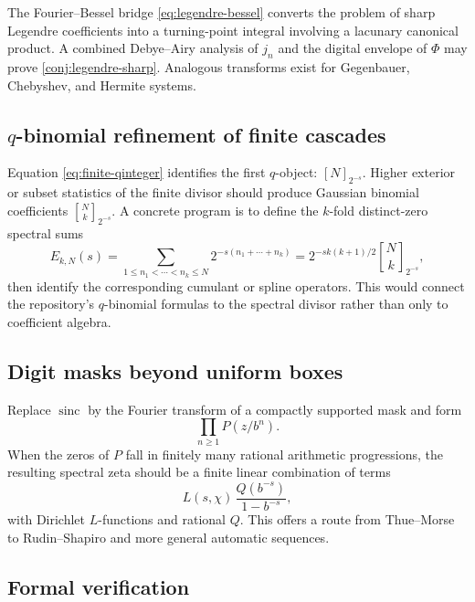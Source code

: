 \documentclass[11pt,oneside]{article}
\theoremstyle{definition}
\theoremstyle{remark}
\newcommand{\sinc}{\operatorname{sinc}}
\begin{document}
The Fourier--Bessel bridge \eqref{eq:legendre-bessel} converts the problem of
sharp Legendre coefficients into a turning-point integral involving a
lacunary canonical product.  A combined Debye--Airy analysis of \(j_n\) and
the digital envelope of \(\Phi\) may prove \cref{conj:legendre-sharp}.
Analogous transforms exist for Gegenbauer, Chebyshev, and Hermite systems.

\subsection{\(q\)-binomial refinement of finite cascades}

Equation \eqref{eq:finite-qinteger} identifies the first \(q\)-object:
\([N]_{2^{-s}}\).  Higher exterior or subset statistics of the finite divisor
should produce Gaussian binomial coefficients
\(\genfrac{[}{]}{0pt}{}{N}{k}_{2^{-s}}\).  A concrete program is to define
the \(k\)-fold distinct-zero spectral sums
\[
 E_{k,N}(s)
 =\sum_{1\leq n_1<\cdots<n_k\leq N}
 2^{-s(n_1+\cdots+n_k)}
 =2^{-sk(k+1)/2}
  \genfrac{[}{]}{0pt}{}{N}{k}_{2^{-s}},
\]
then identify the corresponding cumulant or spline operators.  This would
connect the repository's \(q\)-binomial formulas to the spectral divisor
rather than only to coefficient algebra.

\subsection{Digit masks beyond uniform boxes}

Replace \(\sinc\) by the Fourier transform of a compactly supported mask and
form
\[
 \prod_{n\geq1}P(z/b^n).
\]
When the zeros of \(P\) fall in finitely many rational arithmetic
progressions, the resulting spectral zeta should be a finite linear
combination of terms
\[
 L(s,\chi)\,\frac{Q(b^{-s})}{1-b^{-s}},
\]
with Dirichlet \(L\)-functions and rational \(Q\).  This offers a route from
Thue--Morse to Rudin--Shapiro and more general automatic sequences.

\subsection{Formal verification}
\end{document}
